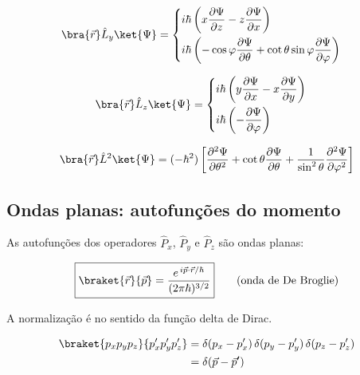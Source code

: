 \begin{equation}
    \bra{\vec{r}} \hat{L}_y \ket{\Psi} =
    \begin{cases}
        i\hbar \left( x \dfrac{\partial \Psi}{\partial z} - z \dfrac{\partial \Psi}{\partial x} \right) \\[3mm]
        i\hbar \left( -\cos\varphi \dfrac{\partial \Psi}{\partial \theta} + \cot\theta\sin\varphi \dfrac{\partial \Psi}{\partial \varphi} \right)
    \end{cases}
\label{eq:aula20_Ly_acao}
\end{equation}

\begin{equation}
    \bra{\vec{r}} \hat{L}_z \ket{\Psi} =
    \begin{cases}
        i\hbar \left( y \dfrac{\partial \Psi}{\partial x} - x \dfrac{\partial \Psi}{\partial y} \right) \\[3mm]
        i\hbar \left( -\dfrac{\partial \Psi}{\partial \varphi} \right)
    \end{cases}
\label{eq:aula20_Lz_acao}
\end{equation}

\begin{equation}
    \bra{\vec{r}} \hat{L}^2 \ket{\Psi} = (-\hbar^2) \left[ \frac{\partial^2 \Psi}{\partial \theta^2} + \cot\theta \frac{\partial \Psi}{\partial \theta} + \frac{1}{\sin^2\theta} \frac{\partial^2 \Psi}{\partial \varphi^2} \right]
\label{eq:aula20_L2_acao}
\end{equation}

\subsection*{Ondas planas: autofunções do momento}

As autofunções dos operadores $\hat{P}_x$, $\hat{P}_y$ e $\hat{P}_z$ são ondas planas:

\begin{equation}
    \boxed{\braket{\vec{r}}{\vec{p}} = \frac{e^{\,i\vec{p}\cdot\vec{r}/\hbar}}{(2\pi\hbar)^{3/2}}} \qquad \text{(onda de De Broglie)}
\label{eq:aula20_onda_plana}
\end{equation}

A normalização é no sentido da função delta de Dirac.

\begin{align}
    \braket{p_x p_y p_z}{p_x' p_y' p_z'} &= \delta(p_x - p_x')\,\delta(p_y - p_y')\,\delta(p_z - p_z') \notag \\
    &= \delta(\vec{p} - \vec{p}')
\label{eq:aula20_delta_p}
\end{align}

